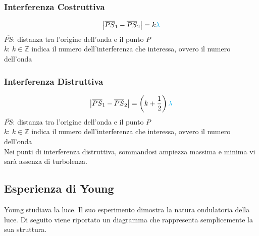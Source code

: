 \subsubsection{Interferenza Costruttiva}
\begin{equation*}
\left\lvert \overline{PS}_1-\overline{PS}_2 \right\rvert = k\mathcolor{cyan}{\lambda}
\end{equation*}
$\overline{PS}$: distanza tra l'origine dell'onda e il punto $P$\\
$k$: $k\in\mathbb{Z}$ indica il numero dell'interferenza che interessa, ovvero il numero dell'onda

\subsubsection{Interferenza Distruttiva}
\begin{equation*}
\left\lvert \overline{PS}_1-\overline{PS}_2 \right\rvert = 
\left( k+\frac{1}{2} \right)\mathcolor{cyan}{\lambda}
\end{equation*}
$\overline{PS}$: distanza tra l'origine dell'onda e il punto $P$\\
$k$: $k\in\mathbb{Z}$ indica il numero dell'interferenza che interessa, ovvero il numero dell'onda\\
[\baselineskip]

Nei punti di interferenza distruttiva, sommandosi ampiezza massima e minima vi sarà assenza di 
turbolenza.

\subsection{Esperienza di Young}\label{subsec:onde:young}
Young studiava la luce. Il suo esperimento dimostra la natura ondulatoria della luce. Di seguito
viene riportato un diagramma che rappresenta semplicemente la sua struttura.

